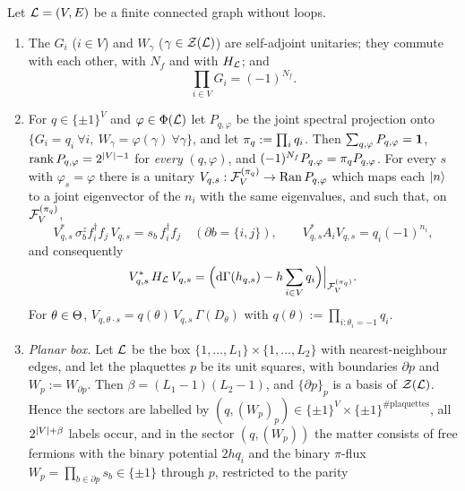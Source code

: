 \begin{theorem}\label{thm:2dmap}
Let $\mathcal{L}=(V,E)$ be a finite connected graph without loops.
\begin{enumerate}[label=(\alph*)]
\item The $G_i$ ($i\in V$) and $W_\gamma$ ($\gamma\in\mathcal{Z}(\mathcal{L})$) are self-adjoint unitaries; they commute
with each other, with $N_f$ and with $H_{\mathcal{L}}$; and
\begin{equation}\label{eq:2dparity}
  \prod_{i\in V}G_i=(-1)^{N_f}.
\end{equation}
\item For $q\in\{\pm1\}^V$ and $\varphi\in\Phi(\mathcal{L})$ let $P_{q,\varphi}$ be the joint spectral projection
onto $\{G_i=q_i\ \forall i,\ W_\gamma=\varphi(\gamma)\ \forall\gamma\}$, and let $\pi_q:=\prod_iq_i$.  Then
$\sum_{q,\varphi}P_{q,\varphi}=\mathbf{1}$, $\operatorname{rank}P_{q,\varphi}=2^{\left|V\right|-1}$ for \emph{every}
$(q,\varphi)$, and $(-1)^{N_f}P_{q,\varphi}=\pi_qP_{q,\varphi}$.  For every $s$ with $\varphi_s=\varphi$ there
is a unitary $V_{q,s}:\mathcal{F}_V^{(\pi_q)}\to\operatorname{Ran}P_{q,\varphi}$ which maps each $|n\rangle$ to a joint
eigenvector of the $n_i$ with the same eigenvalues, and such that, on $\mathcal{F}_V^{(\pi_q)}$,
\begin{equation}\label{eq:2ddict}
  V_{q,s}^*\,\sigma^z_bf_i^\dagger f_j\,V_{q,s}=s_b\,f_i^\dagger f_j\quad(\partial b=\{i,j\}),\qquad
  V_{q,s}^*A_iV_{q,s}=q_i(-1)^{n_i},
\end{equation}
and consequently
\begin{equation}\label{eq:2dsector}
  V_{q,s}^*\,H_{\mathcal{L}}\,V_{q,s}=\Bigl(\mathrm{d}\Gamma(h_{q,s})-h\sum_{i\in V}q_i\Bigr)\Big|_{\mathcal{F}_V^{(\pi_q)}} .
\end{equation}
For $\theta\in\Theta$, $V_{q,\theta\cdot s}=q(\theta)\,V_{q,s}\,\Gamma(D_\theta)$ with
$q(\theta):=\prod_{i:\theta_i=-1}q_i$.
\item \emph{Planar box.}  Let $\mathcal{L}$ be the box $\{1,\dots,L_1\}\times\{1,\dots,L_2\}$ with nearest-neighbour
edges, and let the plaquettes $p$ be its unit squares, with boundaries $\partial p$ and $W_p:=W_{\partial p}$.
Then $\beta=(L_1-1)(L_2-1)$, and $\{\partial p\}_p$ is a basis of $\mathcal{Z}(\mathcal{L})$.  Hence the sectors are
labelled by $(q,(W_p)_p)\in\{\pm1\}^V\times\{\pm1\}^{\#\text{plaquettes}}$, all $2^{\left|V\right|+\beta}$ labels
occur, and in the sector $(q,(W_p))$ the matter consists of free fermions with the binary potential $2hq_i$
and the binary $\pi$-flux $W_p=\prod_{b\in\partial p}s_b\in\{\pm1\}$ through $p$, restricted to the parity

\end{enumerate}
\end{theorem}
